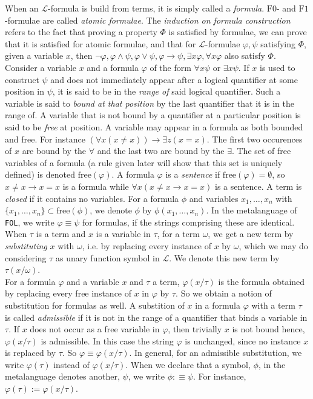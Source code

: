 When an $\mathcal{L}$-formula is build from terms, it is simply called a \emph{formula}. $\mathrm{F0}$- and $\mathrm{F1}$-formulae are called \emph{atomic formulae}. The \emph{induction on formula construction} refers to the fact that proving a property $\Phi$ is satisfied by formulae, we can prove that it is satisfied for atomic formulae, and that for $\mathcal{L}$-formulae $\varphi,\psi$ satisfying $\Phi$, given a variable $x$, then $\neg\varphi,\varphi \wedge \psi,\varphi\vee\psi,\varphi\to \psi,\exists x\varphi,\forall x\varphi$ also satisfy $\Phi$.\\
Consider a variable $x$ and a formula $\varphi$ of the form $\forall x\psi$ or $\exists x\psi$. If $x$ is used to construct $\psi$ and does not immediately appear after a logical quantifier at some position in $\psi$, it is said to be in the \emph{range of} said logical quantifier. Such a variable is said to \emph{bound at that position} by the last quantifier that it is in the range of. A variable that is not bound by a quantifier at a particular position is said to be \emph{free} at position. A variable may appear in a formula as both bounded and free. For instance $(\forall x(x\neq x))\to \exists z(x=x)$. The first two occurences of $x$ are bound by the $\forall$ and the last two are bound by the $\exists$. The set of free variables of a formula (a rule given later will show that this set is uniquely defined) is denoted $\mathrm{free}(\varphi)$. A formula $\varphi$ is a \emph{sentence} if $\mathrm{free}(\varphi)=\emptyset$, so $x\neq x\to x=x$ is a formula while $\forall x(x\neq x\to x=x)$ is a sentence. A term is \emph{closed} if it contains no variables. For a formula $\phi$ and variables $x_1,\dots,x_n$ with $\{x_1,\dots, x_n\}\subset \mathrm{free}(\phi)$, we denote $\phi$ by $\phi(x_1,\dots,x_n)$. In the metalanguage of \verb|FOL|, we write $\varphi \equiv \psi$ for formulas, if the strings comprising these are identical.\\ 
When $\tau$ is a term and $x$ is a variable in $\tau$, for a term $\omega$, we get a new term by \emph{substituting} $x$ with $\omega$, i.e. by replacing every instance of $x$ by $\omega$, which we may do considering $\tau$ as unary function symbol in $\mathcal{L}$. We denote this new term by $\tau(x/\omega)$.\\ 
For a formula $\varphi$ and a variable $x$ and $\tau$ a term, $\varphi(x/\tau)$ is the formula obtained by replacing every free instance of $x$ in $\varphi$ by $\tau$. So we obtain a notion of substitution for formulas as well. A substition of $x$ in a formula $\varphi$ with a term $\tau$ is called \emph{admissible} if it is not in the range of a quantifier that binds a variable in $\tau$. If $x$ does not occur as a free variable in $\varphi$, then trivially $x$ is not bound hence, $\varphi(x/\tau)$ is admissible. In this case the string $\varphi$ is unchanged, since no instance $x$ is replaced by $\tau$. So $\varphi\equiv \varphi(x/\tau)$. In general, for an admissible substitution, we write $\varphi(\tau)$ instead of $\varphi(x/\tau)$. When we declare that a symbol, $\phi$, in the metalanguage denotes another, $\psi$, we write $\phi :\equiv \psi$. For instance, $\varphi(\tau) :=  \varphi(x/\tau)$. 
